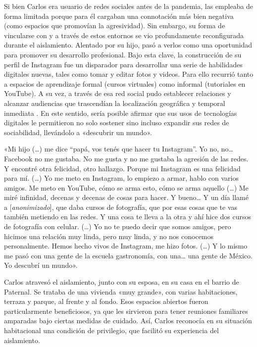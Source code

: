 \begin{refsection}
Si bien Carlos era usuario de redes sociales antes de la pandemia, las empleaba de forma limitada porque para él cargaban una connotación más bien negativa (como espacios que promovían la agresividad). Sin embargo, su forma de vincularse con y a través de estos entornos se vio profundamente reconfigurada durante el aislamiento. Alentado por su hijo, pasó a verlos como una oportunidad para promover su desarrollo profesional. Bajo esta clave, la construcción de su perfil de Instagram fue un disparador para desarrollar una serie de habilidades digitales nuevas, tales como tomar y editar fotos y videos. Para ello recurrió tanto a espacios de aprendizaje formal (cursos virtuales) como informal (tutoriales en YouTube). A su vez, a través de esa red social pudo establecer relaciones y alcanzar audiencias que trascendían la localización geográfica y temporal inmediata \protect\parencite{4209-BOYD2007}. En este sentido, sería posible afirmar que sus usos de tecnologías digitales le permitieron no solo sostener sino incluso expandir sus redes de sociabilidad, llevándolo a «descubrir un mundo».


\begin{gbcita}
«Mi hijo (…) me dice “papá, vos tenés que hacer tu Instagram”. Yo no, no… Facebook no me gustaba. No me gusta y no me gustaba la agresión de las redes. Y encontré otra felicidad, otro hallazgo. Porque mi Instagram es una felicidad para mí. (…) Yo me meto en Instagram, lo empiezo a armar, hablo con varios amigos. Me meto en YouTube, cómo se arma esto, cómo se arma aquello (…) Me miré infinidad, decenas y decenas de cosas para hacer. Y bueno… Y un día llamé a [\emph{anonimizado}], que daba cursos de fotografía, que por esas cosas que te vas también metiendo en las redes. Y una cosa te lleva a la otra y ahí hice dos cursos de fotografía con celular. (…) Yo no te puedo decir que somos amigos, pero hicimos una relación muy linda, pero muy linda, y no nos conocemos personalmente. Hemos hecho vivos de Instagram, me hizo fotos. (…) Y lo mismo me pasó con una gente de la escuela gastronomía, con una… una gente de México. Yo descubrí un mundo».

\end{gbcita}

Carlos atravesó el aislamiento, junto con su esposa, en su casa en el barrio de Paternal. Se trataba de una vivienda «muy grande», con varias habitaciones, terraza y parque, al frente y al fondo. Esos espacios abiertos fueron particularmente beneficiosos, ya que les sirvieron para tener reuniones familiares amparadas bajo ciertas medidas de cuidado. Así, Carlos reconocía en su situación habitacional una condición de privilegio, que facilitó su experiencia del aislamiento.



\end{refsection}
